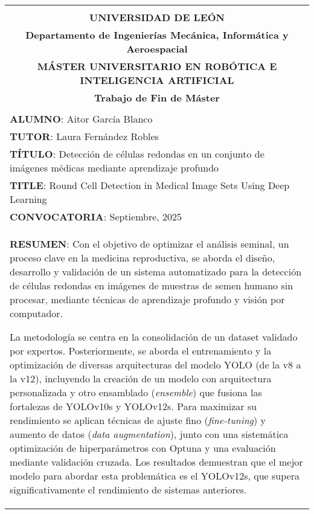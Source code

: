 \begin{center}
\end{center}

\setlength{\LTleft}{-1.25cm}      %
\setlength{\LTright}{0pt}      %

\begin{longtable}{|l|l|}
	\cline{1-2}
	\multicolumn{2}{|c|}{}	\\
	\multicolumn{2}{|c|}{\textbf{UNIVERSIDAD DE LEÓN}}	\\
	\multicolumn{2}{|c|}{\textbf{Departamento de Ingenierías Mecánica, Informática y Aeroespacial}}	\\ 
	\multicolumn{2}{|c|}{\textbf{MÁSTER UNIVERSITARIO EN ROBÓTICA E INTELIGENCIA ARTIFICIAL}}	\\
	\multicolumn{2}{|c|}{\textbf{Trabajo de Fin de Máster}}	\\ 
	\multicolumn{2}{|c|}{}	\\ \hline
	\multicolumn{2}{|l|}{\textbf{ALUMNO}: Aitor García Blanco}	\\ \hline
	\multicolumn{2}{|l|}{\textbf{TUTOR}: Laura Fernández Robles}	\\ \hline
	\multicolumn{2}{|p{17cm}|}{\textbf{TÍTULO}: Detección de células redondas en un conjunto de imágenes médicas mediante aprendizaje profundo} \\ \hline
	\multicolumn{2}{|p{17cm}|}{\textbf{TITLE}: Round Cell Detection in Medical Image Sets Using Deep Learning} \\ \hline
	\multicolumn{2}{|l|}{\textbf{CONVOCATORIA}: Septiembre, 2025}		\\ \hline
	\multicolumn{2}{|p{17cm}|}{\textbf{RESUMEN}: Con el objetivo de optimizar el análisis seminal, un proceso clave en la medicina reproductiva, 
	se aborda el diseño, desarrollo y validación de un sistema automatizado para la detección de células redondas en imágenes de muestras de semen 
	humano sin procesar, mediante técnicas de aprendizaje profundo y visión por computador.
	
	La metodología se centra en la consolidación de un dataset validado por expertos. Posteriormente, se aborda el entrenamiento y la optimización de 
	diversas arquitecturas del modelo YOLO (de la v8 a la v12), incluyendo la creación de un modelo con arquitectura personalizada y otro ensamblado (\textit{ensemble})
	que fusiona las fortalezas de YOLOv10s y YOLOv12s. Para maximizar su rendimiento se aplican técnicas de ajuste fino (\textit{fine-tuning}) y aumento de datos 
	(\textit{data augmentation}), junto con una sistemática optimización de hiperparámetros con Optuna y una evaluación mediante validación cruzada. 
	Los resultados demuestran que el mejor modelo para abordar esta problemática es el YOLOv12s, que supera significativamente el rendimiento de 
	sistemas anteriores.
	
}
\end{longtable}
